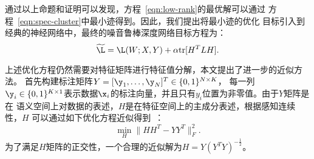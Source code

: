 通过以上命题和证明可以发现，方程~\eqref{eqn:low-rank}的最优解可以通过
方程~\eqref{eqn:spec-cluster}中最小迹得到。因此，我们提出将最小迹的优化
目标引入到经典的神经网络中，最终的噪音鲁棒深度网络目标方程为：
\begin{equation}\label{eqn:rf-cnn-obj}
    \widetilde{\L} = \L(W;X,Y) + \alpha \text{tr}[H^TLH].
\end{equation}

上述优化方程仍然需要对特征矩阵进行特征值分解，本文提出了进一步的近似方法。
首先构建标注矩阵$Y = [\y_1,\ldots, \y_N]^T \in \{0,1\}^{N\times K}$， 每一列
$\y_i\in\{0,1\}^{K\times
1}$表示数据$\x_i$的标注向量，并且只有$y_i$位置为非零值。由于$Y$矩阵是在
语义空间上对数据的表述，$H$是在特征空间上的主成分表述，根据感知连续性，$H$
可以通过如下优化方程近似得到~\cite{yang2011l2,ye2008discriminative}：
\begin{equation}
    \min_{H} \|HH^T - YY^T\|_F^2.
\end{equation}
为了满足$H$矩阵的正交性，一个合理的近似解为$H = Y(Y^TY)^{-\frac{1}{2}}$。


